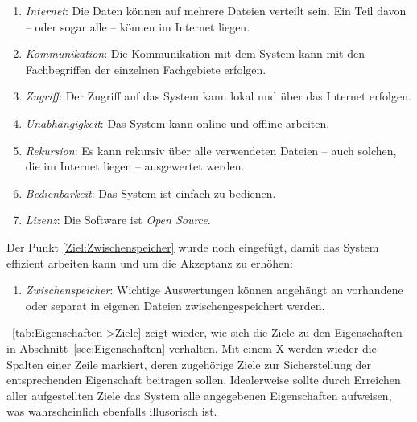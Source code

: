 \documentclass[english,ngerman,parskip=half,headsepline,footsepline]{scrreprt}
\newcounter{Enumi}%
\newcommand*{\sectionname}{Abschnitt}
\begin{document}
\begin{enumerate}
		\item \label{Ziel:Internet} \emph{Internet}: Die Daten können auf mehrere Dateien verteilt sein.
		Ein Teil davon -- oder sogar alle -- können im Internet liegen.

		\item \label{Ziel:Kommunikation} \emph{Kommunikation}: Die Kommunikation mit dem System kann mit den Fachbegriffen der einzelnen Fachgebiete erfolgen.

		\item \label{Ziel:Zugriff} \emph{Zugriff}: Der Zugriff auf das System kann lokal und über das Internet erfolgen.

		\item \label{Ziel:Unabhängigkeit} \emph{Unabhängigkeit}: Das System kann online und offline arbeiten.

		\item \label{Ziel:Rekursion} \emph{Rekursion}: Es kann rekursiv über alle verwendeten Dateien -- auch solchen, die im Internet liegen -- ausgewertet werden.

		\item \label{Ziel:Bedienbarkeit} \emph{Bedienbarkeit}: Das System ist einfach zu bedienen.

		\item \label{Ziel:Lizenz} \emph{Lizenz}: Die Software ist \emph{Open Source}.

		\setcounter{Enumi}{\value{enumi}}%
	\end{enumerate}

	Der Punkt \ref{Ziel:Zwischenspeicher} wurde noch eingefügt, damit das System effizient arbeiten kann und um die Akzeptanz zu erhöhen:

	\begin{enumerate}
		\setcounter{enumi}{\value{Enumi}}

		\item \label{Ziel:Zwischenspeicher} \emph{Zwischenspeicher}: Wichtige Auswertungen können angehängt an vorhandene oder separat in eigenen Dateien zwischengespeichert werden.

	\end{enumerate}

	\tablename~\vref{tab:Eigenschaften->Ziele} zeigt wieder, wie sich die Ziele zu den Eigenschaften in \sectionname~\vref{sec:Eigenschaften} verhalten.
	Mit einem X werden wieder die Spalten einer Zeile markiert, deren zugehörige Ziele zur Sicherstellung der entsprechenden Eigenschaft beitragen sollen.
	Idealerweise sollte durch Erreichen aller aufgestellten Ziele das System alle angegebenen Eigenschaften aufweisen, was wahrscheinlich ebenfalls illusorisch ist.
\end{document}
